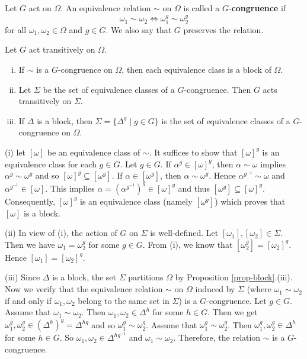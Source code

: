 \begin{definition}
	Let $G$ act on $\Omega$. An equivalence relation $\sim$ on $\Omega$ is called a $G$-\textbf{congruence} if  $$\omega_1 \sim \omega_2 \iff \omega_1^g \sim \omega_2^g$$ 
	for all $\omega_1,\omega_2\in \Omega$ and $g\in G$. We also say that $G$ preserves the relation.
\end{definition}
\begin{proposition} \label{prop-G-congruence}
	Let $G$ act transitively on $\Omega$.
	\begin{enumerate}[(i)]
		\item If $\sim$ is a $G$-congruence on $\Omega$, then each equivalence class is a block of $\Omega$.
		\item Let $\Sigma$ be the set of equivalence classes of a $G$-congruence. Then $G$ acts transitively on $\Sigma$.
		\item  If  $\Delta$ is a block, then $\Sigma = \{\Delta^g\mid g\in G\}$ is the set of equivalence classes of a $G$-congruence on $\Omega$. 
	\end{enumerate}
\end{proposition}
\begin{sketch}
	(i) let $[\omega]$ be an equivalence class of $\sim$. It suffices to show that $[\omega]^g$ is an equivalence class for each $g\in G$. Let $g\in G$. If $\alpha^g\in [\omega]^g$, then $\alpha \sim \omega$ implies $\alpha^g \sim \omega^g$ and so $[\omega]^g\subseteq [\omega^g]$. If $\alpha\in [\omega^g]$, then $\alpha \sim \omega^g$. Hence $\alpha^{g^{-1}} \sim \omega$ and $\alpha^{g^{-1}}\in [\omega]$. This implies $\alpha = (\alpha^{g^{-1}})^g \in [\omega]^g$ and thus $[\omega^g]\subseteq [\omega]^g$. Consequently, $[\omega]^g$ is an equivalence class (namely $[\omega^g]$) which proves that $[\omega]$ is a block. 
	
(ii) In view of (i), the action of $G$ on $\Sigma$ is well-defined. Let $[\omega_1],[\omega_2]\in\Sigma$. Then we have $\omega_1 = \omega_2^g$ for some $g\in G$. From (i), we know that $[\omega_2^g] = [\omega_2]^g$. Hence $[\omega_1] = [\omega_2]^g$.
	
(iii) Since $\Delta$ is a block, the set $\Sigma$ partitions $\Omega$ by Proposition \ref{prop-block}.(iii). Now we verify that the equivalence relation $\sim$ on $\Omega$ induced by $\Sigma$ (where $\omega_1\sim\omega_2$ if and only if $\omega_1,\omega_2$ belong to the same set in $\Sigma$) is a $G$-congruence. Let $g\in G$. Assume  that $\omega_1 \sim \omega_2$. Then   $\omega_1, \omega_2 \in \Delta^h$ for some $h \in G$.  Then we get $\omega_1^g,\omega_2^g \in (\Delta^h)^g = \Delta^{hg}$ and so $\omega_1^g\sim\omega_2^g$.
 Assume that $\omega_1^g \sim \omega_2^g$. Then $\omega_1^g, \omega_2^g \in \Delta^{h}$ for some $h\in G$. So $\omega_1,\omega_2\in \Delta^{hg^{-1}}$ and $\omega_1\sim\omega_2$.  Therefore, the relation $\sim$ is a $G$-congruence.
\end{sketch}

